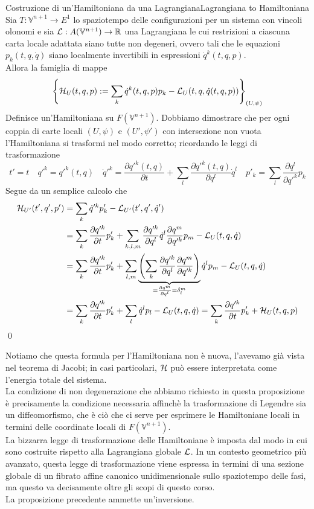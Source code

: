 \documentclass[openany]{book}
\renewcommand\V{\mathbb{V}}
\begin{document}
\begin{proposition}{Costruzione di un'Hamiltoniana da una Lagrangiana}{Lagrangiana to Hamiltoniana}
    Sia $T:\V^{n+1}\to E^1$ lo spaziotempo delle configurazioni per un sistema con vincoli olonomi e sia $\L:A(\V^{n+1})\to\R$ una Lagrangiana le cui restrizioni a ciascuna carta locale adattata siano tutte non degeneri, ovvero tali che le equazioni $p_k(t,q,\dot q)$ siano localmente invertibili in espressioni $\dot q^k(t,q,p)$.\\
    Allora la famiglia di mappe 
    \[ \left\{\mathcal{H}_U(t,q,p) := \sum_k \dot q^k(t,q,p)p_k - \mathcal{L}_U(t,q,\dot q(t,q,p)) \right\}_{(U,\psi)} \]
    Definisce un'Hamiltoniana su $F(\V^{n+1})$.
    \proof
    Dobbiamo dimostrare che per ogni coppia di carte locali $(U,\psi)$ e $(U',\psi')$ con intersezione non vuota l'Hamiltoniana si trasformi nel modo corretto; ricordando le leggi di trasformazione 
    \[ t' = t \quad q'^k = q'^k(t, q) \quad \dot q'^k = \frac{\partial q'^k(t,q)}{\partial t} + \sum_l \frac{\partial q'^k(t,q)}{\partial q^l}\dot q^l \quad p'_k = \sum_l \frac{\partial q^l}{\partial q'^k}p_k \]
    Segue da un semplice calcolo che 
    \begin{align*}
        \mathcal{H}_{U'}(t',q',p') & = \sum_k\dot q'^k p'_k - \mathcal{L}_{U'}(t',q',\dot q') \\
        & = \sum_k \frac{\partial q'^k}{\partial t}p'_k + \sum_{k,l,m} \frac{\partial q'^k}{\partial q^l}\dot q^l \frac{\partial q^m}{\partial q'^k} p_m - \mathcal{L}_U(t,q,\dot q) \\
        & = \sum_k \frac{\partial q'^k}{\partial t}p'_k + \sum_{l,m}\underbrace{\left( \sum_k \frac{\partial q'^k}{\partial q^l}\frac{\partial q^m}{\partial q'^k} \right)}_{= \frac{\partial q^m}{\partial q^l} = \delta_l^m }\dot q^l p_m - \mathcal{L}_U(t,q,\dot q) \\
        & = \sum_k \frac{\partial q'^k}{\partial t}p'_k + \sum_l \dot q^l p_l - \mathcal{L}_U(t,q,\dot q) = \sum_k \frac{\partial q'^k}{\partial t}p'_k + \mathcal{H}_U(t,q,p)
    \end{align*}
    \qed
\end{proposition}

Notiamo che questa formula per l'Hamiltoniana non è nuova, l'avevamo già vista nel teorema di Jacobi; in casi particolari, $\mathcal{H}$ può essere interpretata come l'energia totale del sistema.\\
La condizione di non degenerazione che abbiamo richiesto in questa proposizione è precisamente la condizione necessaria affinchè la trasformazione di Legendre sia un diffeomorfismo, che è ciò che ci serve per esprimere le Hamiltoniane locali in termini delle coordinate locali di $F(\V^{n+1})$.\\
La bizzarra legge di trasformazione delle Hamiltoniane è imposta dal modo in cui sono costruite rispetto alla Lagrangiana globale $\mathcal{L}$. In un contesto geometrico più avanzato, questa legge di trasformazione viene espressa in termini di una sezione globale di un fibrato affine canonico unidimensionale sullo spaziotempo delle fasi, ma questo va decisamente oltre gli scopi di questo corso.\\
La proposizione precedente ammette un'inversione.
\end{document}

